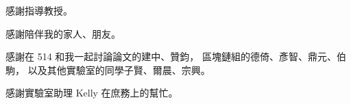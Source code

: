 \begin{acknowledgementszh}
感謝指導教授。

感謝陪伴我的家人、朋友。

感謝在 514 和我一起討論論文的建中、贊鈞，
區塊鏈組的德倚、彥智、鼎元、伯駒，
以及其他實驗室的同學子賢、爾晨、宗興。

感謝實驗室助理 Kelly 在庶務上的幫忙。

\end{acknowledgementszh}
